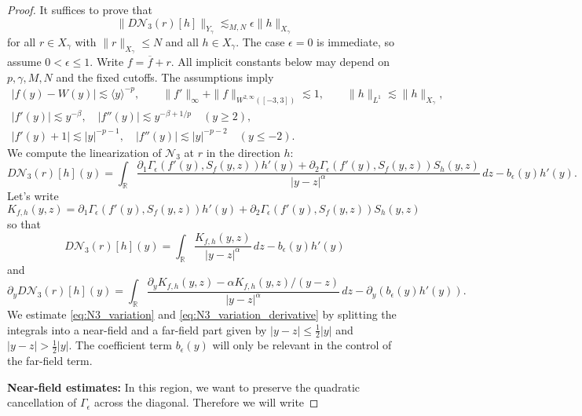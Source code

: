 \documentclass[11pt]{amsart}
\theoremstyle{definition}
\theoremstyle{remark}
\numberwithin{equation}{section}
\newcommand{\R}{\mathbb{R}}
\newcommand{\mc}[1]{\mathcal{#1}}
\newcommand{\ov}[1]{\overline{#1}}
\newcommand{\ang}[1]{\langle #1 \rangle}
\begin{document}
\begin{proof}
It suffices to prove that 
\[\|D\mc{N}_3(r)[h]\|_{Y_\gamma} \lesssim_{M,N} \epsilon \|h\|_{X_\gamma}\]
for all $r \in X_\gamma$ with $\|r\|_{X_\gamma} \leq N$ and all $h \in X_\gamma$. The case $\epsilon=0$ is immediate, so assume $0<\epsilon\le1$. Write $f = \ov{f} + r$.
All implicit constants below may depend on $p,\gamma,M,N$ and the fixed
cutoffs. The assumptions imply
\begin{gather}
    |f(y)-W(y)|\lesssim\ang{y}^{-p},\qquad
    \|f'\|_\infty+\|f\|_{W^{2,\infty}([-3,3])}\lesssim1,
    \qquad \|h\|_{L^1}\lesssim\|h\|_{X_\gamma},\label{eq:N3_global}\\
    |f'(y)|\lesssim y^{-\beta},\quad
    |f''(y)|\lesssim y^{-\beta+1/p}\quad(y\ge2),\label{eq:N3_plus_profile}\\
    |f'(y)+1|\lesssim|y|^{-p-1},\quad
    |f''(y)|\lesssim|y|^{-p-2}\quad(y\le-2).\label{eq:N3_minus_profile}
\end{gather}
We compute the linearization of $\mc{N}_3$ at $r$ in the direction $h$:
\begin{equation}\label{eq:N3_variation}
    D\mc{N}_3(r)[h](y)
    =\int_{\R}\frac{\partial_1 \Gamma_\epsilon(f'(y),S_f(y,z))h'(y)
          +\partial_2 \Gamma_\epsilon(f'(y),S_f(y,z))S_h(y,z)}{|y-z|^{\alpha}}\,dz
       -b_\epsilon(y)h'(y).
\end{equation}
Let's write 
\begin{equation}\label{eq:N3_integrand}K_{f,h}(y, z) = \partial_1 \Gamma_\epsilon(f'(y), S_f(y, z))h'(y) + \partial_2 \Gamma_\epsilon(f'(y), S_f(y, z))S_h(y, z)\end{equation}
so that
\[D\mc{N}_3(r)[h](y)
    =\int_{\R}\frac{K_{f,h}(y, z)}{|y-z|^{\alpha}}\,dz
       -b_\epsilon(y)h'(y)\]
and
\begin{equation}\label{eq:N3_variation_derivative}\partial_y D\mc{N}_3(r)[h](y) = \int_{\R}\frac{\partial_y K_{f,h}(y, z) - \alpha K_{f,h}(y, z) / (y - z)}{|y-z|^{\alpha}}\,dz - \partial_y (b_\epsilon(y)h'(y)).\end{equation}
We estimate \eqref{eq:N3_variation} and \eqref{eq:N3_variation_derivative} by splitting the integrals into a near-field and a far-field part given by $|y - z| \leq \frac{1}{2}|y|$ and $|y - z| > \frac{1}{2}|y|$. The coefficient term $b_\epsilon(y)$ will only be relevant in the control of the far-field term. \par 
\textbf{Near-field estimates:} In this region, we want to preserve the quadratic cancellation of $\Gamma_\epsilon$ across the diagonal. Therefore we will write 

\end{proof}
\end{document}
